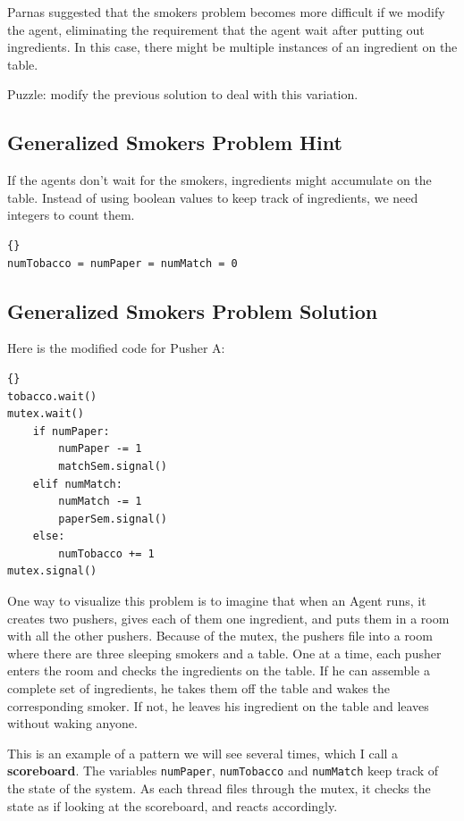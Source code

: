 \documentclass{book}
\newcommand{\clearemptydoublepage}{\newpage\cleardoublepage}
\begin{document}
Parnas suggested that the smokers problem becomes more
difficult if we modify the agent, eliminating the requirement
that the agent wait after putting out ingredients.  In this
case, there might be multiple instances of an ingredient on
the table.

Puzzle: modify the previous solution to deal with this
variation.

\clearemptydoublepage
\subsection{Generalized Smokers Problem Hint}

If the agents don't wait for the smokers, ingredients might
accumulate on the table.  Instead of using boolean values to
keep track of ingredients, we need integers to count them.

\begin{lstlisting}[caption={Generalized Smokers problem hint}]{}
numTobacco = numPaper = numMatch = 0
\end{lstlisting}


\clearemptydoublepage
\subsection{Generalized Smokers Problem Solution}
\label{smoker}

Here is the modified code for Pusher A:

\begin{lstlisting}[caption={Pusher A}]{}
tobacco.wait()
mutex.wait()
    if numPaper:
        numPaper -= 1
        matchSem.signal()
    elif numMatch:
        numMatch -= 1
        paperSem.signal()
    else: 
        numTobacco += 1
mutex.signal()
\end{lstlisting}

One way to visualize this problem is to imagine that when an
Agent runs, it creates two pushers, gives each of them one ingredient,
and puts them in a room with all the other pushers.  Because of the
mutex, the pushers file into a room where there are
three sleeping smokers and a table.  One at a time, each pusher enters
the room and checks the ingredients on the table.  If he can
assemble a complete set of ingredients, he takes them off the table
and wakes the corresponding smoker.  If not, he leaves his ingredient
on the table and leaves without waking anyone.

This is an example of a pattern we will see several times, which
I call a {\bf scoreboard}.  The variables {\tt numPaper}, {\tt numTobacco}
and {\tt numMatch} keep track of the state of the system.  As each
thread files through the mutex, it checks the state as if looking
at the scoreboard, and reacts accordingly.
\end{document}
